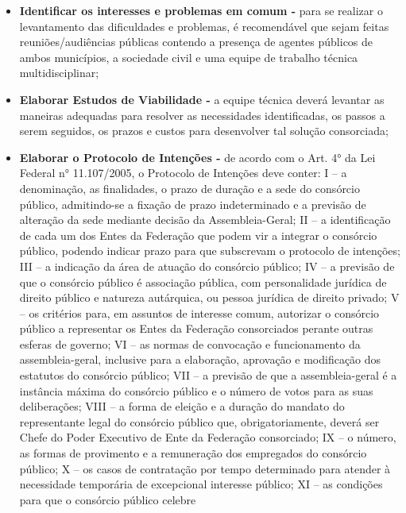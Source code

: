 \begin{itemize}
	\item \textbf{Identificar os interesses e problemas em comum -} para se realizar o levantamento das dificuldades e problemas, é recomendável que sejam feitas reuniões/audiências públicas contendo a presença de agentes públicos de ambos municípios, a sociedade civil e uma equipe de trabalho técnica multidisciplinar;   
	
	\item \textbf{Elaborar Estudos de Viabilidade -} a equipe técnica deverá levantar as maneiras adequadas para resolver as necessidades identificadas, os passos a serem seguidos, os prazos e custos para desenvolver tal solução consorciada;
	
	\item \textbf{Elaborar o Protocolo de Intenções -} de acordo com o Art. 4° da Lei Federal n° 11.107/2005, o Protocolo de Intenções deve conter:
	\subitem I – a denominação, as finalidades, o prazo de duração e a
	sede do consórcio público, admitindo-se a fixação de prazo
	indeterminado e a previsão de alteração da sede mediante
	decisão da Assembleia-Geral;
	\subitem II – a identificação de cada um dos Entes da Federação
	que podem vir a integrar o consórcio público, podendo indicar prazo para que subscrevam o protocolo de intenções;
	\subitem III – a indicação da área de atuação do consórcio público;
	\subitem IV – a previsão de que o consórcio público é associação
	pública, com personalidade jurídica de direito público e
	natureza autárquica, ou pessoa jurídica de direito privado;
	\subitem V – os critérios para, em assuntos de interesse comum, autorizar o consórcio público a representar os Entes da Federação consorciados perante outras esferas de governo;
	\subitem VI – as normas de convocação e funcionamento da assembleia-geral, inclusive para a elaboração, aprovação e modificação dos estatutos do consórcio público;
	\subitem VII – a previsão de que a assembleia-geral é a instância
	máxima do consórcio público e o número de votos para as
	suas deliberações;
	\subitem VIII – a forma de eleição e a duração do mandato do representante legal do consórcio público que, obrigatoriamente,
	deverá ser Chefe do Poder Executivo de Ente da Federação consorciado;
	\subitem IX – o número, as formas de provimento e a remuneração
	dos empregados do consórcio público;
	\subitem X – os casos de contratação por tempo determinado para
	atender à necessidade temporária de excepcional interesse público;
	\subitem XI – as condições para que o consórcio público celebre

\end{itemize}
